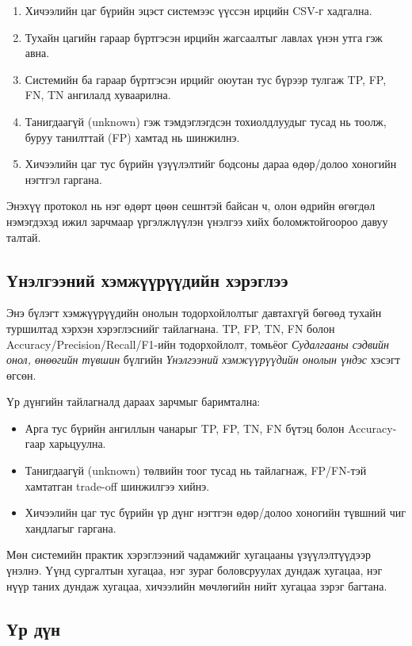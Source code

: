 \begin{enumerate}
	\item Хичээлийн цаг бүрийн эцэст системээс үүссэн ирцийн CSV-г хадгална.
	\item Тухайн цагийн гараар бүртгэсэн ирцийн жагсаалтыг лавлах үнэн утга гэж авна.
	\item Системийн ба гараар бүртгэсэн ирцийг оюутан тус бүрээр тулгаж TP, FP, FN, TN ангилалд хуваарилна.
	\item Танигдаагүй (unknown) гэж тэмдэглэгдсэн тохиолдлуудыг тусад нь тоолж, буруу танилттай (FP) хамтад нь шинжилнэ.
	\item Хичээлийн цаг тус бүрийн үзүүлэлтийг бодсоны дараа өдөр/долоо хоногийн нэгтгэл гаргана.
\end{enumerate}

Энэхүү протокол нь нэг өдөрт цөөн сешнтэй байсан ч, олон өдрийн өгөгдөл нэмэгдэхэд ижил зарчмаар үргэлжлүүлэн үнэлгээ хийх боломжтойгоороо давуу талтай.

\subsection{Үнэлгээний хэмжүүрүүдийн хэрэглээ}
Энэ бүлэгт хэмжүүрүүдийн онолын тодорхойлолтыг давтахгүй бөгөөд тухайн туршилтад хэрхэн хэрэглэснийг тайлагнана. TP, FP, TN, FN болон Accuracy/Precision/Recall/F1-ийн тодорхойлолт, томьёог \textit{Судалгааны сэдвийн онол, өнөөгийн түвшин} бүлгийн \textit{Үнэлгээний хэмжүүрүүдийн онолын үндэс} хэсэгт өгсөн.

Үр дүнгийн тайлагналд дараах зарчмыг баримтална:
\begin{itemize}
	\item Арга тус бүрийн ангиллын чанарыг TP, FP, TN, FN бүтэц болон Accuracy-гаар харьцуулна.
	\item Танигдаагүй (unknown) төлвийн тоог тусад нь тайлагнаж, FP/FN-тэй хамтатган trade-off шинжилгээ хийнэ.
	\item Хичээлийн цаг тус бүрийн үр дүнг нэгтгэн өдөр/долоо хоногийн түвшний чиг хандлагыг гаргана.
\end{itemize}

Мөн системийн практик хэрэглээний чадамжийг хугацааны үзүүлэлтүүдээр үнэлнэ. Үүнд сургалтын хугацаа, нэг зураг боловсруулах дундаж хугацаа, нэг нүүр таних дундаж хугацаа, хичээлийн мөчлөгийн нийт хугацаа зэрэг багтана.

\subsection{Үр дүн}

